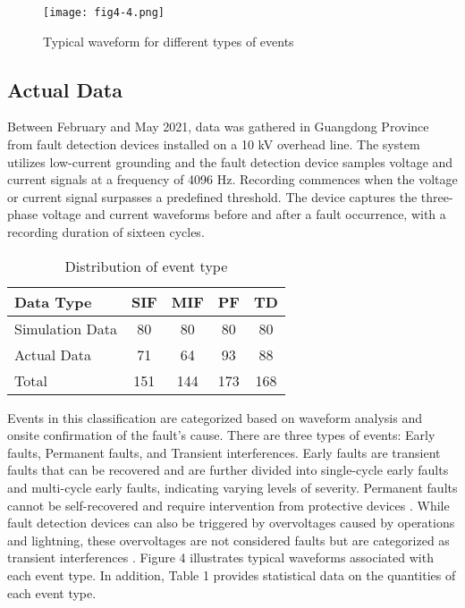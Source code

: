 \documentclass[conference]{IEEEtran}
\begin{document}
\begin{figure}[htbp]
\centerline{\texttt{[image: fig4-4.png]}}
\caption{Typical waveform for different types of events}
\label{fig}
\end{figure}

\subsection{Actual Data}

Between February and May 2021, data was gathered in Guangdong Province from fault detection devices installed on a 10 kV overhead line. The system utilizes low-current grounding and the fault detection device samples voltage and current signals at a frequency of 4096 Hz. Recording commences when the voltage or current signal surpasses a predefined threshold. The device captures the three-phase voltage and current waveforms before and after a fault occurrence, with a recording duration of sixteen cycles.



\begin{table}[htbp]

\caption{Distribution of event type}

\begin{center}

\begin{tabular}{lcccc}

\hline

Data Type & SIF & MIF & PF & TD \\

\hline

Simulation Data & 80 & 80 & 80 & 80 \\

Actual Data & 71 & 64 & 93 & 88 \\

Total & 151 & 144 & 173 & 168 \\

\hline

\end{tabular}

\end{center}

\end{table}



Events in this classification are categorized based on waveform analysis and onsite confirmation of the fault's cause. There are three types of events: Early faults, Permanent faults, and Transient interferences. Early faults are transient faults that can be recovered and are further divided into single-cycle early faults and multi-cycle early faults, indicating varying levels of severity. Permanent faults cannot be self-recovered and require intervention from protective devices \cite{xie2016development}. While fault detection devices can also be triggered by overvoltages caused by operations and lightning, these overvoltages are not considered faults but are categorized as transient interferences \cite{zhang2020research}. Figure 4 illustrates typical waveforms associated with each event type. In addition, Table 1 provides statistical data on the quantities of each event type.
\end{document}
